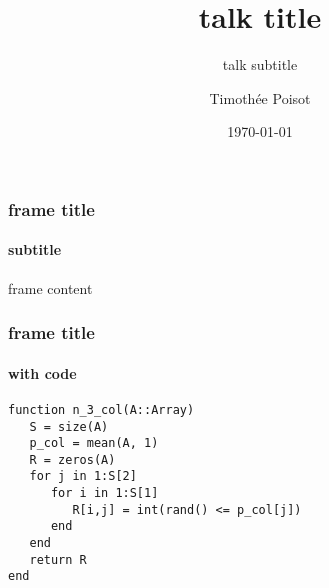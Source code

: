 \documentclass[10pt,aspectratio=149]{beamer}
\author{Timoth\'ee Poisot}
\title{talk title}
\subtitle{talk subtitle}
\date{\today}
\institute{talk location}
\begin{document}
\begin{frame}[plain]
   \titlepage
\end{frame}

\begin{frame}
   \frametitle{frame title}
   \framesubtitle{subtitle}

   frame content
   
\end{frame}

\begin{frame}[fragile]
   \frametitle{frame title}
   \framesubtitle{with code}

   \begin{verbatim}
function n_3_col(A::Array)
   S = size(A)
   p_col = mean(A, 1)
   R = zeros(A)
   for j in 1:S[2]
      for i in 1:S[1]
         R[i,j] = int(rand() <= p_col[j])
      end
   end
   return R
end
   \end{verbatim}
   
\end{frame}
\end{document}
